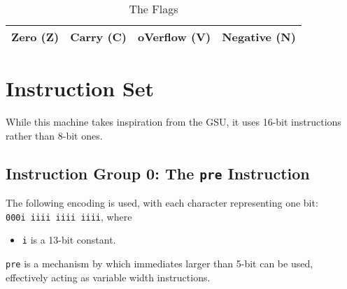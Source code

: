 \documentclass{article}
\begin{document}
	\begin{table}[H]
		\begin{center}
			\caption{The Flags}
			\label{tab:flags}
			\begin{tabular}{|c|c|c|c|}
				\hline
				Zero (Z) & Carry (C) & oVerflow (V) & Negative (N)\\
				\hline
			\end{tabular}
		\end{center}
	\end{table}

	\newpage
	\section{Instruction Set}
	While this machine takes inspiration from the GSU, it uses 16-bit
	instructions rather than 8-bit ones.

	\subsection{Instruction Group 0:  The \texttt{pre} Instruction}
	The following encoding is used, with each character representing one
	bit:  \\
	\texttt{000i iiii iiii iiii}, where 
	
	\singlespacing
	\begin{itemize}
		\item \texttt{i} is a 13-bit constant.
	\end{itemize}


	\texttt{pre} is a mechanism by which immediates larger than 5-bit can
	be used, effectively acting as variable width instructions.
	
\end{document}

